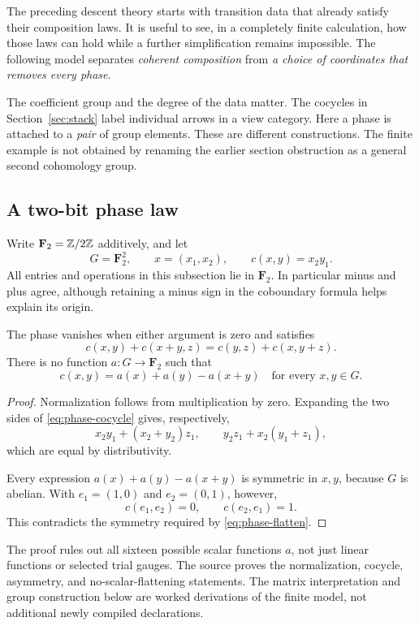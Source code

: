 \clearpage
{}\label{sec:phase}
The preceding descent theory starts with transition data that already satisfy their composition laws. It is useful to see, in a completely finite calculation, how those laws can hold while a further simplification remains impossible. The following model separates \emph{coherent composition} from \emph{a choice of coordinates that removes every phase}.

The coefficient group and the degree of the data matter. The cocycles in Section~\ref{sec:stack} label individual arrows in a view category. Here a phase is attached to a \emph{pair} of group elements. These are different constructions. The finite example is not obtained by renaming the earlier section obstruction as a general second cohomology group.

\subsection{A two-bit phase law}
Write \(\mathbf F_2=\mathbb Z/2\mathbb Z\) additively, and let
\[
 G=\mathbf F_2^2,\qquad x=(x_1,x_2),\qquad
 c(x,y)=x_2y_1.
\]
All entries and operations in this subsection lie in \(\mathbf F_2\). In particular minus and plus agree, although retaining a minus sign in the coboundary formula helps explain its origin.

\begin{proposition}\label{KS80}
The phase vanishes when either argument is zero and satisfies
\begin{equation}\label{eq:phase-cocycle}
 c(x,y)+c(x+y,z)=c(y,z)+c(x,y+z).
\end{equation}
There is no function \(a:G\to\mathbf F_2\) such that
\begin{equation}\label{eq:phase-flatten}
 c(x,y)=a(x)+a(y)-a(x+y)\quad\text{for every }x,y\in G.
\end{equation}
\end{proposition}
\begin{proof}
Normalization follows from multiplication by zero. Expanding the two sides of \eqref{eq:phase-cocycle} gives, respectively,
\[
 x_2y_1+(x_2+y_2)z_1,
 \qquad y_2z_1+x_2(y_1+z_1),
\]
which are equal by distributivity.

Every expression \(a(x)+a(y)-a(x+y)\) is symmetric in \(x,y\), because \(G\) is abelian. With \(e_1=(1,0)\) and \(e_2=(0,1)\), however,
\[
 c(e_1,e_2)=0,\qquad c(e_2,e_1)=1.
\]
This contradicts the symmetry required by \eqref{eq:phase-flatten}.
\end{proof}
The proof rules out all sixteen possible scalar functions \(a\), not just linear functions or selected trial gauges. The source  proves the normalization, cocycle, asymmetry, and no-scalar-flattening statements. The matrix interpretation and group construction below are worked derivations of the finite model, not additional newly compiled declarations.

